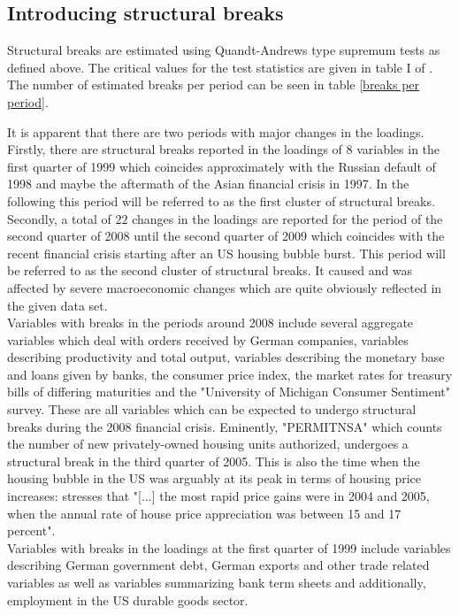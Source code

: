 \documentclass[12pt]{article}
\begin{document}
\clearpage


\subsection{Introducing structural breaks}
Structural breaks are estimated using Quandt-Andrews type supremum tests as defined above. The critical values for the test statistics are given in table I of \citet{andrews2003tests}. The number of estimated breaks per period can be seen in table \ref{breaks per period}.

It is apparent that there are two periods with major changes in the loadings. Firstly, there are structural breaks reported in the loadings of $8$ variables in the first quarter of 1999 which coincides approximately with the Russian default of 1998 and maybe the aftermath of the Asian financial crisis in 1997. In the following this period will be referred to as the first cluster of structural breaks. Secondly, a total of $22$ changes in the loadings are reported for the period of the second quarter of 2008 until the second quarter of 2009 which coincides with the recent financial crisis starting after an US housing bubble burst. This period will be referred to as the second cluster of structural breaks. It caused and was affected by severe macroeconomic changes which are quite obviously reflected in the given data set. \\

Variables with breaks in the periods around 2008 include several aggregate variables which deal with orders received by German companies, variables describing productivity and total output, variables describing the monetary base and loans given by banks, the consumer price index, the market rates for treasury bills of differing maturities and the "University of Michigan Consumer Sentiment" survey. These are all variables which can be expected to undergo structural breaks during the 2008 financial crisis. Eminently, "PERMITNSA" which counts the number of new privately-owned housing units authorized, undergoes a structural break in the third quarter of 2005. This is also the time when the housing bubble in the US was arguably at its peak in terms of housing price increases: \citet{bernanke2010monetary} stresses that "[...] the most rapid price gains were in 2004 and 2005, when the annual rate of house price appreciation was between 15 and 17 percent". \\

Variables with breaks in the loadings at the first quarter of 1999 include variables describing German government debt, German exports and other trade related variables as well as variables summarizing bank term sheets and additionally, employment in the US durable goods sector.
\end{document}
